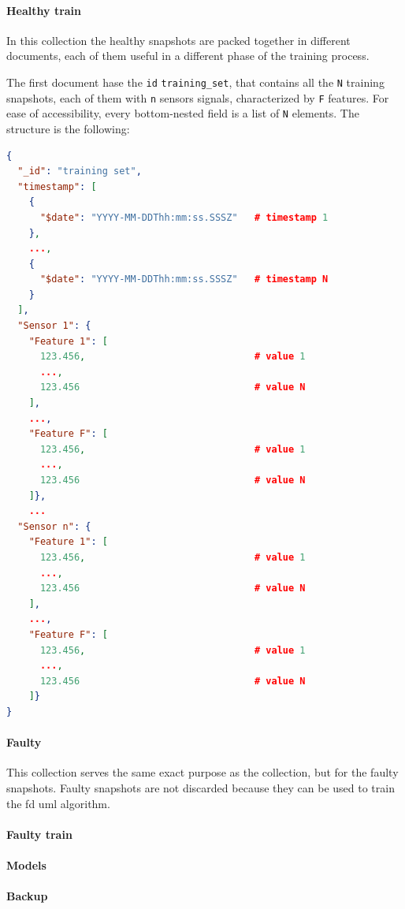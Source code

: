 \paragraph{Healthy train}
In this collection the healthy snapshots are packed together in different documents, each of them useful in a different phase of the training process. 

{The first document hase the \texttt{id} \texttt{training\_set}, that contains all the \texttt{N} training snapshots, each of them with \texttt{n} sensors signals, characterized by \texttt{F} features. For ease of accessibility, every bottom-nested field is a list of \texttt{N} elements. The structure is the following:}

\begin{lstlisting}[language=json,firstnumber=1]
{
  "_id": "training set",
  "timestamp": [
    {
      "$date": "YYYY-MM-DDThh:mm:ss.SSSZ" 	# timestamp 1
    },  
	...,
    {   
      "$date": "YYYY-MM-DDThh:mm:ss.SSSZ" 	# timestamp N
    }
  ],
  "Sensor 1": {
    "Feature 1": [
      123.456,								# value 1
      ...,
      123.456								# value N
    ],
	...,
	"Feature F": [
      123.456,								# value 1
      ...,
      123.456								# value N
    ]},
	...
  "Sensor n": {
    "Feature 1": [
      123.456,								# value 1
      ...,
      123.456								# value N
    ],
	...,
	"Feature F": [
      123.456,								# value 1
      ...,
      123.456								# value N
    ]}
}
\end{lstlisting}

\paragraph{Faulty}
This collection serves the same exact purpose as the  collection, but for the faulty snapshots. Faulty snapshots are not discarded because they can be used to train the \gls{fd} \gls{uml} algorithm.

\paragraph{Faulty train}

\paragraph{Models}


\paragraph{Backup}


